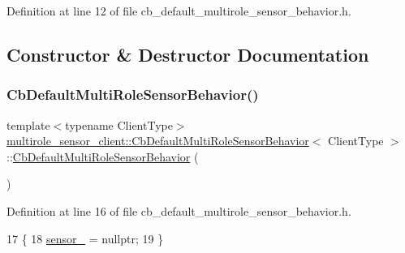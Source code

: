 Definition at line 12 of file cb\+\_\+default\+\_\+multirole\+\_\+sensor\+\_\+behavior.\+h.



\subsection{Constructor \& Destructor Documentation}
\mbox{\label{classmultirole__sensor__client_1_1CbDefaultMultiRoleSensorBehavior_a5164809f8d47f821134a481246f8f99c}} 
\subsubsection{\texorpdfstring{Cb\+Default\+Multi\+Role\+Sensor\+Behavior()}{CbDefaultMultiRoleSensorBehavior()}}
{\footnotesize\ttfamily template$<$typename Client\+Type$>$ \\
\hyperlink{classmultirole__sensor__client_1_1CbDefaultMultiRoleSensorBehavior}{multirole\+\_\+sensor\+\_\+client\+::\+Cb\+Default\+Multi\+Role\+Sensor\+Behavior}$<$ Client\+Type $>$\+::\hyperlink{classmultirole__sensor__client_1_1CbDefaultMultiRoleSensorBehavior}{Cb\+Default\+Multi\+Role\+Sensor\+Behavior} (\begin{DoxyParamCaption}{ }\end{DoxyParamCaption})\hspace{0.3cm}{\ttfamily [inline]}}



Definition at line 16 of file cb\+\_\+default\+\_\+multirole\+\_\+sensor\+\_\+behavior.\+h.


\begin{DoxyCode}
17   \{
18     \hyperlink{classmultirole__sensor__client_1_1CbDefaultMultiRoleSensorBehavior_a5e4e65ada73da49c2b8579b422b97d0d}{sensor\_} = \textcolor{keyword}{nullptr};
19   \}
\end{DoxyCode}


